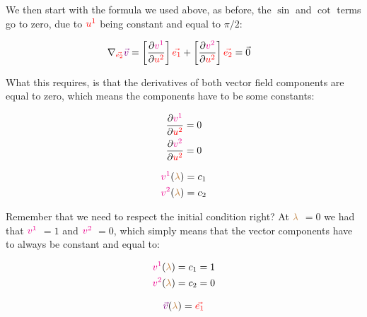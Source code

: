We then start with the formula we used above, as before, the $\sin$ and $\cot$ terms go to zero, due to $\color{red}u^1$ being 
constant and equal to $\pi/2$:

\begin{align*}
    \nabla_{\begingroup\color{red}\vec{e_2}\endgroup}\begingroup\color{violet}\vec{v}\endgroup
    &= \left[\frac{\partial \begingroup\color{magenta}v^1\endgroup}{\partial \begingroup\color{red}u^2\endgroup}\right]\begingroup\color{red}\vec{e_1}\endgroup
    + \left[\frac{\partial \begingroup\color{magenta}v^2\endgroup}{\partial \begingroup\color{red}u^2\endgroup}\right]\begingroup\color{red}\vec{e_2}\endgroup = \vec{0}
\end{align*}

What this requires, is that the derivatives of both vector field components are equal to zero, which means the components have to be some constants:

\begin{align*}
    \frac{\partial \begingroup\color{magenta}v^1\endgroup}{\partial \begingroup\color{red}u^2\endgroup} &= 0 \\
    \frac{\partial \begingroup\color{magenta}v^2\endgroup}{\partial \begingroup\color{red}u^2\endgroup} &= 0
\end{align*}

\begin{align*}
    \begingroup\color{magenta}v^1\endgroup(\begingroup\color{brown}\lambda\endgroup) &= c_1\\
    \begingroup\color{magenta}v^2\endgroup(\begingroup\color{brown}\lambda\endgroup) &= c_2
\end{align*}

Remember that we need to respect the initial condition right? At $\color{brown}\lambda$ $=0$ we had that $\color{magenta}v^1$ $= 1$ and 
$\color{magenta}v^2$ $= 0$, which simply means that the vector components have to always be constant and equal to:

\begin{align*}
    \begingroup\color{magenta}v^1\endgroup(\begingroup\color{brown}\lambda\endgroup) &= c_1 = 1\\
    \begingroup\color{magenta}v^2\endgroup(\begingroup\color{brown}\lambda\endgroup) &= c_2 = 0
\end{align*}

\begin{equation}
    \begingroup\color{violet}\vec{v}\endgroup(\begingroup\color{brown}\lambda\endgroup) = \begingroup\color{red}\vec{e_1}\endgroup 
\end{equation}

